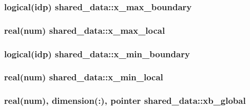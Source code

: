 \subsubsection[{\texorpdfstring{x\+\_\+max\+\_\+boundary}{x_max_boundary}}]{\setlength{\rightskip}{0pt plus 5cm}logical(idp) shared\+\_\+data\+::x\+\_\+max\+\_\+boundary}\hypertarget{namespaceshared__data_aaa822590de7afd77e48ecc4d9016fe29}{}\label{namespaceshared__data_aaa822590de7afd77e48ecc4d9016fe29}
\subsubsection[{\texorpdfstring{x\+\_\+max\+\_\+local}{x_max_local}}]{\setlength{\rightskip}{0pt plus 5cm}real(num) shared\+\_\+data\+::x\+\_\+max\+\_\+local}\hypertarget{namespaceshared__data_ab8f75a4e4e6aa88619c4f1cfde4dae1c}{}\label{namespaceshared__data_ab8f75a4e4e6aa88619c4f1cfde4dae1c}
\subsubsection[{\texorpdfstring{x\+\_\+min\+\_\+boundary}{x_min_boundary}}]{\setlength{\rightskip}{0pt plus 5cm}logical(idp) shared\+\_\+data\+::x\+\_\+min\+\_\+boundary}\hypertarget{namespaceshared__data_a1fb2edce254dcc9943d5a9d227ea3c58}{}\label{namespaceshared__data_a1fb2edce254dcc9943d5a9d227ea3c58}
\subsubsection[{\texorpdfstring{x\+\_\+min\+\_\+local}{x_min_local}}]{\setlength{\rightskip}{0pt plus 5cm}real(num) shared\+\_\+data\+::x\+\_\+min\+\_\+local}\hypertarget{namespaceshared__data_a4a7c4b6eb045c3017f04dc08eb5cddcd}{}\label{namespaceshared__data_a4a7c4b6eb045c3017f04dc08eb5cddcd}
\subsubsection[{\texorpdfstring{xb\+\_\+global}{xb_global}}]{\setlength{\rightskip}{0pt plus 5cm}real(num), dimension(\+:), pointer shared\+\_\+data\+::xb\+\_\+global}\hypertarget{namespaceshared__data_a22e4d784058444556c04be431d584ec7}{}\label{namespaceshared__data_a22e4d784058444556c04be431d584ec7}
